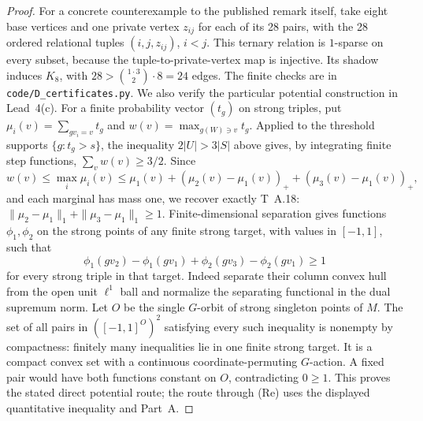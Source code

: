 \begin{proof}
For a concrete counterexample to the published remark itself, take
eight base vertices and one private vertex $z_{ij}$ for each of
its 28 pairs, with the 28 ordered relational tuples $(i,j,z_{ij})$,
$i<j$. This ternary relation is $1$-sparse on every subset, because
the tuple-to-private-vertex map is injective. Its shadow induces
$K_8$, with $28>\binom{1\cdot3}{2}\cdot8=24$ edges.
The finite checks are in \texttt{code/D\_certificates.py}.
We also verify the particular potential construction in Lead~4(c).
For a finite probability vector $(t_g)$ on strong triples, put
$\mu_i(v)=\sum_{gv_i=v}t_g$ and
$w(v)=\max_{g(W)\ni v}t_g$. Applied to the threshold supports
$\{g:t_g>s\}$, the inequality $2|U|>3|S|$ above gives, by
integrating finite step functions,
$\sum_v w(v)\geq3/2$. Since
\[
 w(v)\leq\max_i\mu_i(v)\leq
 \mu_1(v)+(\mu_2(v)-\mu_1(v))_+
          +(\mu_3(v)-\mu_1(v))_+,
\]
and each marginal has mass one, we recover exactly T~A.18:
$\|\mu_2-\mu_1\|_1+\|\mu_3-\mu_1\|_1\geq1$.
Finite-dimensional separation gives functions
$\phi_1,\phi_2$ on the strong points of any finite strong target,
with values in $[-1,1]$, such that
\[
 \phi_1(gv_2)-\phi_1(gv_1)+
 \phi_2(gv_3)-\phi_2(gv_1)\geq1
\]
for every strong triple in that target. Indeed separate their
column convex hull from the open unit $\ell^1$ ball and normalize
the separating functional in the dual supremum norm.
Let $O$ be the single $G$-orbit of strong singleton points of $M$.
The set of all pairs in $([-1,1]^O)^2$ satisfying every such
inequality is nonempty by compactness: finitely many inequalities
lie in one finite strong target. It is a compact convex set with
a continuous coordinate-permuting $G$-action. A fixed pair would
have both functions constant on $O$, contradicting $0\geq1$.
This proves the stated direct potential route; the route through
(Re) uses the displayed quantitative inequality and Part~A.
\end{proof}

